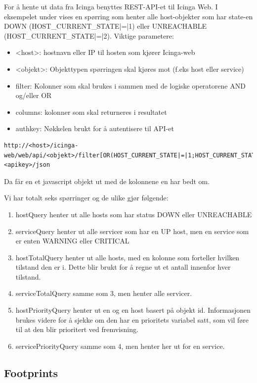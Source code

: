 For å hente ut data fra Icinga benyttes REST-API-et til Icinga Web. I eksempelet under vises en spørring som henter alle host-objekter som har state-en DOWN (HOST\_CURRENT\_STATE|=|1) eller UNREACHABLE (HOST\_CURRENT\_STATE|=|2). Viktige parametere:
\begin{itemize}
	\item <host>: hostnavn eller IP til hosten som kjører Icinga-web
	\item <objekt>: Objekttypen spørringen skal kjøres mot (f.eks host eller service)
	\item filter: Kolonner som skal brukes i sammen med de logiske operatorene AND og/eller OR
	\item columns: kolonner som skal returneres i resultatet
	\item authkey: Nøkkelen brukt for å autentisere til API-et
\end{itemize}

\begin{lstlisting}[style=example]
http://<host>/icinga-web/web/api/<objekt>/filter[OR(HOST_CURRENT_STATE|=|1;HOST_CURRENT_STATE|=|2)]/columns[HOST_ID|HOST_CURRENT_CHECK_ATTEMPT|...]/authkey=<apikey>/json
\end{lstlisting}

Da får en et javascript objekt ut med de kolonnene en har bedt om.

Vi har totalt seks spørringer og de ulike gjør følgende:
\begin{enumerate}
	\item  hostQuery henter ut alle hosts som har status DOWN eller UNREACHABLE
	\item  serviceQuery henter ut alle servicer som har en UP host, men en service som er enten WARNING eller CRITICAL
	\item  hostTotalQuery henter ut alle hosts, med en kolonne som forteller hvilken tilstand den er i. Dette blir brukt for å regne ut et antall innenfor hver tilstand.
	\item  serviceTotalQuery samme som 3, men henter alle servicer.
	\item  hostPriorityQuery henter ut en og en host basert på objekt id. Informasjonen brukes videre for å sjekke om den har en prioritets variabel satt, som vil føre til at den blir prioritert ved fremvisning.
	\item  servicePriorityQuery samme som 4, men henter her ut for en service.
\end{enumerate}

\subsection{Footprints}


